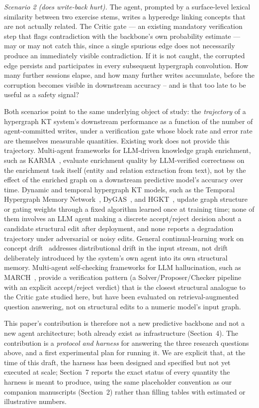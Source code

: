 \documentclass[review,12pt]{elsarticle}
\begin{document}
\emph{Scenario 2 (does write-back hurt).} The agent, prompted by a
surface-level lexical similarity between two exercise stems, writes a
hyperedge linking concepts that are not actually related. The Critic
gate --- an existing mandatory verification step that flags contradiction
with the backbone's own probability estimate --- may or may not catch
this, since a single spurious edge does not necessarily produce an
immediately visible contradiction. If it is not caught, the corrupted
edge persists and participates in every subsequent hypergraph
convolution. How many further sessions elapse, and how many further
writes accumulate, before the corruption becomes visible in downstream
accuracy -- and is that too late to be useful as a safety signal?

Both scenarios point to the same underlying object of study: the
\emph{trajectory} of a hypergraph KT system's downstream performance as
a function of the number of agent-committed writes, under a verification
gate whose block rate and error rate are themselves measurable
quantities. Existing work does not provide this trajectory. Multi-agent
frameworks for LLM-driven knowledge graph enrichment, such as
KARMA~\cite{lu2025karma}, evaluate enrichment quality by LLM-verified
correctness on the enrichment task itself (entity and relation
extraction from text), not by the effect of the enriched graph on a
downstream predictive model's accuracy over time. Dynamic and temporal
hypergraph KT models, such as the Temporal Hypergraph Memory
Network~\cite{mohammadi2025thmn}, DyGAS~\cite{li2025dygas}, and
HGKT~\cite{lei2025hgkt}, update graph structure or gating weights through
a fixed algorithm learned once at training time; none of them involves an
LLM agent making a discrete accept/reject decision about a candidate
structural edit after deployment, and none reports a degradation
trajectory under adversarial or noisy edits. General continual-learning
work on concept drift~\cite{ashrafee2025amr} addresses distributional
drift in the input stream, not drift deliberately introduced by the
system's own agent into its own structural memory. Multi-agent
self-checking frameworks for LLM hallucination, such as
MARCH~\cite{li2026march}, provide a verification pattern (a
Solver/Proposer/Checker pipeline with an explicit accept/reject verdict)
that is the closest structural analogue to the Critic gate studied here,
but have been evaluated on retrieval-augmented question answering, not
on structural edits to a numeric model's input graph.

This paper's contribution is therefore not a new predictive backbone and
not a new agent architecture; both already exist as infrastructure
(Section~4). The contribution is a \emph{protocol and harness} for
answering the three research questions above, and a first experimental
plan for running it. We are explicit that, at the time of this draft, the
harness has been designed and specified but not yet executed at scale;
Section~7 reports the exact status of every quantity the harness is
meant to produce, using the same placeholder convention as our companion
manuscripts (Section~2) rather than filling tables with estimated or
illustrative numbers.
\end{document}
